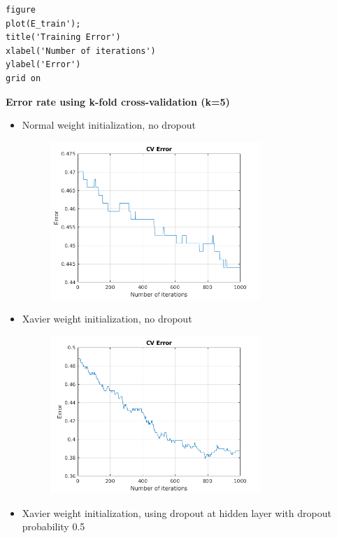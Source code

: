 \documentclass[12pt]{article}
\begin{document}
\begin{lstlisting}
figure
plot(E_train');
title('Training Error')
xlabel('Number of iterations')
ylabel('Error')
grid on
\end{lstlisting}
\textbf{Error rate using k-fold cross-validation (k=5)}
\begin{itemize}
    \item Normal weight initialization, no dropout
        \begin{figure}[H]
        \begin{center}
          \includegraphics[width=0.75\textwidth]{images/Ex2a.png}
         \end{center}
        \end{figure}    
    \item Xavier weight initialization, no dropout
         \begin{figure}[H]
        \begin{center}
          \includegraphics[width=0.75\textwidth]{images/Ex2b.png}
         \end{center}
        \end{figure}    
    \item Xavier weight initialization, using dropout at hidden layer with dropout probability 0.5

\end{itemize}
\end{document}

